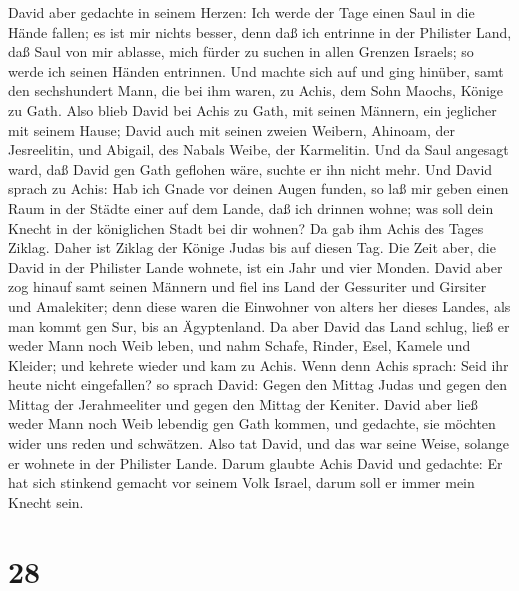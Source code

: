  David aber gedachte in seinem Herzen: Ich werde der Tage
einen Saul in die Hände fallen; es ist mir nichts besser, denn daß ich
entrinne in der Philister Land, daß Saul von mir ablasse, mich fürder zu
suchen in allen Grenzen Israels; so werde ich seinen Händen entrinnen.
 Und machte sich auf und ging hinüber, samt den sechshundert
Mann, die bei ihm waren, zu Achis, dem Sohn Maochs, Könige zu Gath.
 Also blieb David bei Achis zu Gath, mit seinen Männern, ein
jeglicher mit seinem Hause; David auch mit seinen zweien Weibern,
Ahinoam, der Jesreelitin, und Abigail, des Nabals Weibe, der Karmelitin.
 Und da Saul angesagt ward, daß David gen Gath geflohen
wäre, suchte er ihn nicht mehr.  Und David sprach zu Achis:
Hab ich Gnade vor deinen Augen funden, so laß mir geben einen Raum in
der Städte einer auf dem Lande, daß ich drinnen wohne; was soll dein
Knecht in der königlichen Stadt bei dir wohnen?  Da gab ihm
Achis des Tages Ziklag. Daher ist Ziklag der Könige Judas bis auf diesen
Tag.  Die Zeit aber, die David in der Philister Lande
wohnete, ist ein Jahr und vier Monden.  David aber zog
hinauf samt seinen Männern und fiel ins Land der Gessuriter und Girsiter
und Amalekiter; denn diese waren die Einwohner von alters her dieses
Landes, als man kommt gen Sur, bis an Ägyptenland.  Da aber
David das Land schlug, ließ er weder Mann noch Weib leben, und nahm
Schafe, Rinder, Esel, Kamele und Kleider; und kehrete wieder und kam zu
Achis.  Wenn denn Achis sprach: Seid ihr heute nicht
eingefallen? so sprach David: Gegen den Mittag Judas und gegen den
Mittag der Jerahmeeliter und gegen den Mittag der Keniter. 
David aber ließ weder Mann noch Weib lebendig gen Gath kommen, und
gedachte, sie möchten wider uns reden und schwätzen. Also tat David, und
das war seine Weise, solange er wohnete in der Philister Lande.
 Darum glaubte Achis David und gedachte: Er hat sich
stinkend gemacht vor seinem Volk Israel, darum soll er immer mein Knecht
sein.

\hypertarget{section-27}{%
\section{28}\label{section-27}}

